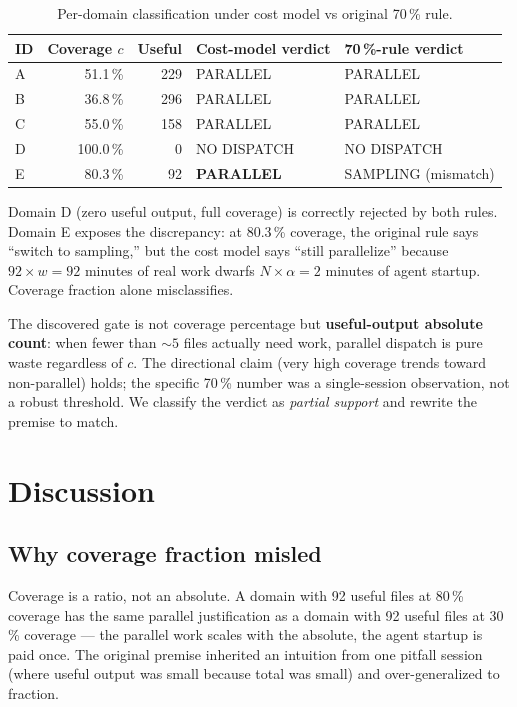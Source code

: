 \documentclass[10pt,letterpaper]{article}
\begin{document}
\begin{table}[h]
\centering
\caption{Per-domain classification under cost model vs original 70\,\% rule.}
\label{tab:results}
\begin{tabular}{lrrll}
\toprule
ID & Coverage $c$ & Useful & Cost-model verdict & 70\,\%-rule verdict \\
\midrule
A & 51.1\,\% & 229 & \textsc{PARALLEL} & \textsc{PARALLEL} \\
B & 36.8\,\% & 296 & \textsc{PARALLEL} & \textsc{PARALLEL} \\
C & 55.0\,\% & 158 & \textsc{PARALLEL} & \textsc{PARALLEL} \\
D & 100.0\,\% & 0 & \textsc{NO DISPATCH} & \textsc{NO DISPATCH} \\
E & 80.3\,\% & 92 & \textbf{\textsc{PARALLEL}} & \textsc{SAMPLING} (mismatch) \\
\bottomrule
\end{tabular}
\end{table}

Domain D (zero useful output, full coverage) is correctly rejected by both
rules. Domain E exposes the discrepancy: at 80.3\,\% coverage, the original
rule says ``switch to sampling,'' but the cost model says ``still
parallelize'' because $92 \times w = 92$ minutes of real work dwarfs
$N \times \alpha = 2$ minutes of agent startup. Coverage fraction alone
misclassifies.

The discovered gate is not coverage percentage but
\textbf{useful-output absolute count}: when fewer than $\sim 5$ files
actually need work, parallel dispatch is pure waste regardless of $c$. The
directional claim (very high coverage trends toward non-parallel) holds;
the specific 70\,\% number was a single-session observation, not a robust
threshold. We classify the verdict as \emph{partial support} and rewrite
the premise to match.

\section{Discussion}
\label{sec:discussion}

\subsection{Why coverage fraction misled}

Coverage is a ratio, not an absolute. A domain with 92 useful files at
80\,\% coverage has the same parallel justification as a domain with 92
useful files at 30\,\% coverage --- the parallel work scales with the
absolute, the agent startup is paid once. The original premise inherited
an intuition from one pitfall session (where useful output was small
because total was small) and over-generalized to fraction.
\end{document}
